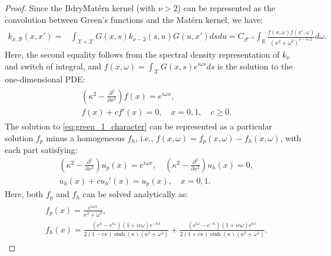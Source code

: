 \documentclass[10pt,a4paper]{amsart}
\newcommand{\CalF}{\mathcal{F}}
\newcommand{\CalX}{\mathcal X}
\newcommand{\Real}{\mathbb R}
\begin{document}
\begin{proof}
Since the BdryMat\'ern kernel (with $\nu > 2$) can be represented as the convolution between Green's functions and the Mat\'ern kernel, we have:
\begin{align}
    k_{\nu,\mathcal{B}}(x,x')=&\int_{\CalX\times\CalX}G(x,s)k_{\nu-2}(s,u)G(u,x')dsdu
    =C_{\CalF^{-1}}\int_\Real\frac{f(x,\omega)\overline{f(x',\omega)}}{(\kappa^2+\omega^2)^{\nu-3/2}}d\omega.
     \label{eq:kernel_green_1d}
\end{align}
Here, the second equality follows from the spectral density representation of $k_\nu$ and switch of integral, and $f(x,\omega)=\int_{\CalX}G(x,s)e^{i\omega s}ds$ is the solution to the one-dimensional PDE:
\begin{align}
\begin{split}
   & \left(\kappa^2-\frac{\partial^2}{\partial x^2}\right)f(x)=e^{i\omega x},\\
   &f(x)+cf'(x)=0,\quad x=0,1,\quad c\geq 0.
   \end{split}
\label{eq:green_1_character}
\end{align}
The solution to \eqref{eq:green_1_character} can be represented as a particular solution $f_p$ minus a homogeneous $f_h$, i.e., $f(x,\omega)=f_p(x,\omega)-f_h(x,\omega)$, with each part satisfying:
\begin{align*}
    &\left(\kappa^2-\frac{\partial^2}{\partial x^2}
    \right)u_p(x)=e^{i\omega x},\quad \left(\kappa^2-\frac{\partial^2}{\partial x^2}\right)u_h(x)=0,\\
   & u_h(x)+cu_h'(x)=u_p(x),\quad x=0,1.
\end{align*}
Here, both $f_p$ and $f_h$ can be solved analytically as:
\begin{align}
\begin{split}
    & f_p(x)=\frac{e^{i\omega x}}{\kappa^2+\omega^2},\\
    & f_h(x)=\frac{(e^\kappa-e^{i\omega})(1+ic\omega)e^{-\kappa x}}{2(1-c\kappa)\sinh(\kappa)(\kappa^2+\omega^2)}+\frac{(e^{i\omega}-e^{-\kappa})(1+ic\omega)e^{\kappa x}}{2(1+c\kappa)\sinh(\kappa)(\kappa^2+\omega^2)}.

\end{split}
\end{align}
\end{proof}
\end{document}
